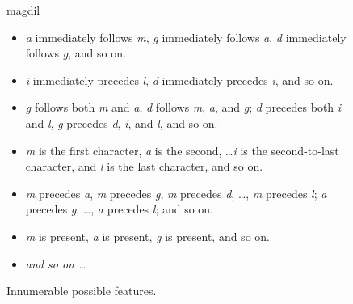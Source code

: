 \begin{figure}[ht]
\caption{Innumerable possible features.}
\label{fig:many-feats}
\begin{center}
\Large{magdil}
\end{center}
\begin{itemize}
  \item \textit{a} immediately follows \textit{m}, \textit{g} immediately follows \textit{a}, \textit{d} immediately follows \textit{g}, and so on. 
  \item \textit{i} immediately precedes \textit{l}, \textit{d} immediately precedes \textit{i}, and so on. %
   \item \textit{g} follows both \textit{m} and \textit{a}, \textit{d} follows \textit{m}, \textit{a}, and \textit{g}; \textit{d} precedes both \textit{i} and \textit{l}, \textit{g} precedes \textit{d}, \textit{i}, and \textit{l}, and so on.
   \item \textit{m} is the first character, \textit{a} is the second, \dots \textit{i} is the second-to-last character, and \textit{l} is the last character, and so on.
   \item \textit{m} precedes \textit{a}, \textit{m} precedes \textit{g}, \textit{m} precedes \textit{d}, \dots, \textit{m} precedes \textit{l}; \textit{a} precedes \textit{g}, \dots , \textit{a} precedes \textit{l}; and so on.
   \item \textit{m} is present, \textit{a} is present, \textit{g} is present, and so on.
   \item \emph{and so on \dots}
\end{itemize}
\end{figure}

